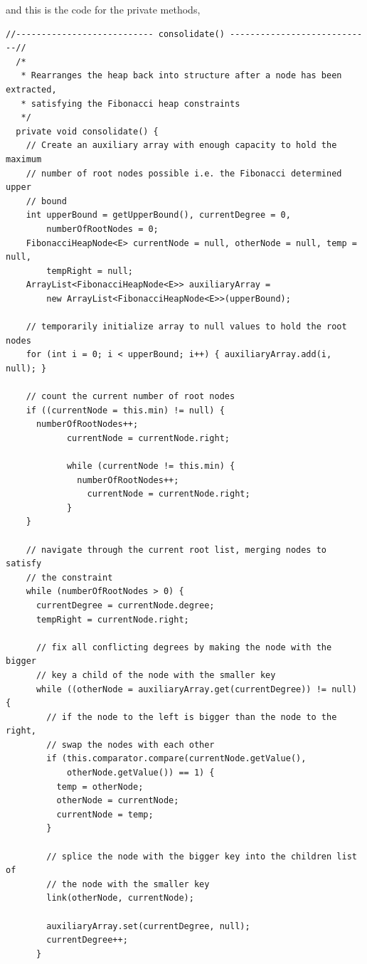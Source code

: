 \documentclass{article}
\begin{document}
and this is the code for the private methods,\\
\begin{lstlisting}
//--------------------------- consolidate() ----------------------------//
  /*
   * Rearranges the heap back into structure after a node has been extracted, 
   * satisfying the Fibonacci heap constraints 
   */
  private void consolidate() {
    // Create an auxiliary array with enough capacity to hold the maximum
    // number of root nodes possible i.e. the Fibonacci determined upper 
    // bound
    int upperBound = getUpperBound(), currentDegree = 0,
        numberOfRootNodes = 0;
    FibonacciHeapNode<E> currentNode = null, otherNode = null, temp = null,
        tempRight = null;
    ArrayList<FibonacciHeapNode<E>> auxiliaryArray = 
        new ArrayList<FibonacciHeapNode<E>>(upperBound);
    
    // temporarily initialize array to null values to hold the root nodes
    for (int i = 0; i < upperBound; i++) { auxiliaryArray.add(i, null); }
    
    // count the current number of root nodes
    if ((currentNode = this.min) != null) {
      numberOfRootNodes++;
            currentNode = currentNode.right;

            while (currentNode != this.min) {
              numberOfRootNodes++;
                currentNode = currentNode.right;
            }
    }
    
    // navigate through the current root list, merging nodes to satisfy
    // the constraint
    while (numberOfRootNodes > 0) {  
      currentDegree = currentNode.degree;
      tempRight = currentNode.right;
      
      // fix all conflicting degrees by making the node with the bigger
      // key a child of the node with the smaller key
      while ((otherNode = auxiliaryArray.get(currentDegree)) != null) {
        // if the node to the left is bigger than the node to the right,
        // swap the nodes with each other
        if (this.comparator.compare(currentNode.getValue(),
            otherNode.getValue()) == 1) {
          temp = otherNode;            
          otherNode = currentNode;
          currentNode = temp;
        }
        
        // splice the node with the bigger key into the children list of
        // the node with the smaller key
        link(otherNode, currentNode);
        
        auxiliaryArray.set(currentDegree, null);
        currentDegree++;
      }
      

\end{lstlisting}
\end{document}
